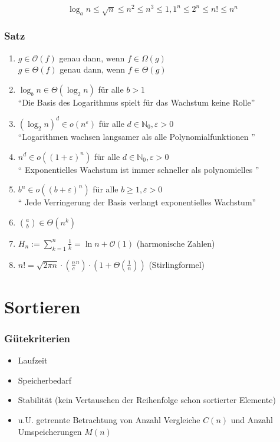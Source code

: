 \documentclass{scrartcl}
\begin{document}
\begin{shaded}
\[ \log_a{n} \leq \sqrt{n} \leq n^2 \leq n^3 \leq 1,1^n \leq 2^n \leq n! \leq n^n\]
\end{shaded}

\subsubsection{Satz}
\begin{enumerate}
	\item $g \in \mathcal{O}(f) $ genau dann, wenn $f \in \Omega(g) $
	\\ $g \in \Theta(f) $ genau dann, wenn $f \in \Theta(g) $
	\item $\log_b{n} \in \Theta (\log_2{n}) $ für alle $b>1$ \\
	"`Die Basis des Logarithmus spielt für das Wachstum keine Rolle"'
	\item $ (\log_2{n})^d \in o(n^\varepsilon) $ für alle $d \in \mathds{N}_0, \varepsilon>0$\\
	"`Logarithmen wachsen langsamer als alle Polynomialfunktionen "'
	\item $ n^d \in o((1+\varepsilon)^n) $ für alle $d\in \mathds{N}_0, \varepsilon>0$\\
	"` Exponentielles Wachstum ist immer schneller als polynomielles "'
	\item $ b^n \in o((b+\varepsilon)^n) $ für alle $b\geq 1, \varepsilon>0$ \\
	"` Jede Verringerung der Basis verlangt exponentielles Wachstum"'
	\item $ \binom{a}{b} \in \Theta(n^k)$
	\item $H_n := \sum^n_{k=1} \frac{1}{k} = \ln n + \mathcal{O}(1)$ {\tiny (harmonische Zahlen)}
	\item $n! = \sqrt{2\pi n} \cdot \left( \frac{n}{c}^n \right) \cdot \left( 1+\Theta \left( \frac{1}{n} \right) \right)$ {\tiny (Stirlingformel)}
\end{enumerate}



\section{Sortieren}
\subsubsection{Gütekriterien}
\begin{itemize}
	\item Laufzeit
	\item Speicherbedarf
	\item Stabilität (kein Vertauschen der Reihenfolge schon sortierter Elemente)
	\item u.U. getrennte Betrachtung von Anzahl Vergleiche $C(n)$ und Anzahl Umspeicherungen $M(n)$
\end{itemize}
\end{document}
